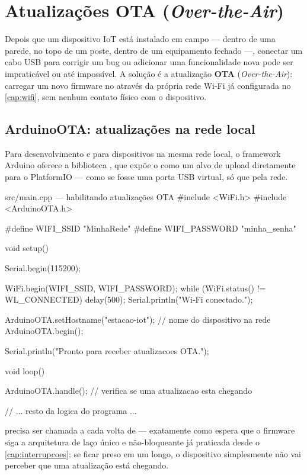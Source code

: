 \chapter{Atualizações OTA (\emph{Over-the-Air})}
\label{cap:ota}

Depois que um dispositivo IoT está instalado em campo — dentro de uma parede, no topo de um poste, dentro de um equipamento fechado —, conectar um cabo USB para corrigir um bug ou adicionar uma funcionalidade nova pode ser impraticável ou até impossível. A solução é a atualização \textbf{OTA} (\emph{Over-the-Air}): carregar um novo firmware no \ESP{} através da própria rede Wi-Fi já configurada no \cref{cap:wifi}, sem nenhum contato físico com o dispositivo.

\section{ArduinoOTA: atualizações na rede local}

Para desenvolvimento e para dispositivos na mesma rede local, o framework Arduino oferece a biblioteca , que expõe o \ESP{} como um alvo de upload diretamente para o PlatformIO — como se fosse uma porta USB virtual, só que pela rede.

\begin{codigoc}{src/main.cpp — habilitando atualizações OTA}
#include <WiFi.h>
#include <ArduinoOTA.h>

#define WIFI_SSID     "MinhaRede"
#define WIFI_PASSWORD "minha_senha"

void setup() {
    Serial.begin(115200);

    WiFi.begin(WIFI_SSID, WIFI_PASSWORD);
    while (WiFi.status() != WL_CONNECTED) {
        delay(500);
    }
    Serial.println("Wi-Fi conectado.");

    ArduinoOTA.setHostname("estacao-iot");   // nome do dispositivo na rede
    ArduinoOTA.begin();

    Serial.println("Pronto para receber atualizacoes OTA.");
}

void loop() {
    ArduinoOTA.handle();   // verifica se uma atualizacao esta chegando

    // ... resto da logica do programa ...
}
\end{codigoc}

 precisa ser chamada a cada volta de  — exatamente como  espera que o firmware siga a arquitetura de laço único e não-bloqueante já praticada desde o \cref{cap:interrupcoes}: se  ficar preso em um  longo, o dispositivo simplesmente não vai perceber que uma atualização está chegando.

